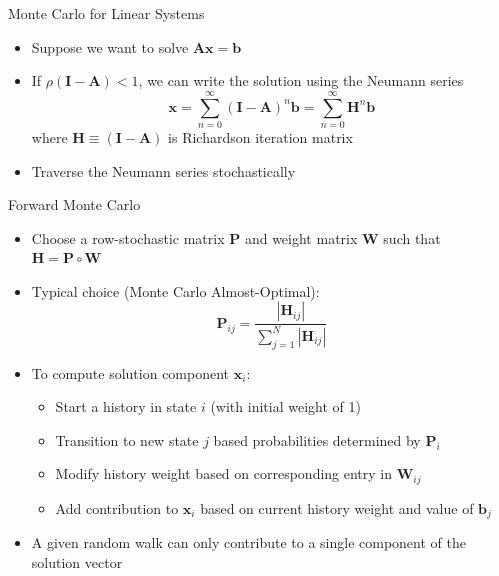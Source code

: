 \documentclass{beamer}
\begin{document}
\begin{frame}{Monte Carlo for Linear Systems}
  \begin{itemize}
    \item Suppose we want to solve $\mathbf{Ax}=\mathbf{b}$
    \vfill
    \item If $\rho(\mathbf{I-A})<1$, we can write the solution using the
      Neumann series
      \begin{equation*}
        \mathbf{x} = \sum_{n=0}^{\infty} (\mathbf{I-A})^n \mathbf{b}
         = \sum_{n=0}^{\infty} \mathbf{H}^n \mathbf{b}
      \end{equation*}
      where $\mathbf{H} \equiv ( \mathbf{I-A} )$ is Richardson iteration matrix
    \vfill
    \item Traverse the Neumann series stochastically
  \end{itemize}
\end{frame}
\begin{frame}{Forward Monte Carlo}
\begin{itemize}
  \item Choose a row-stochastic matrix $\mathbf{P}$ and weight matrix
    $\mathbf{W}$ such that $\mathbf{H} = \mathbf{P} \circ \mathbf{W}$
  \item Typical choice (Monte Carlo Almost-Optimal):
    \begin{equation*}
      \mathbf{P}_{ij} = \frac{| \mathbf{H}_{ij}| }
      {\sum_{j=1}^{N} | \mathbf{H}_{ij} | }
    \end{equation*}
  \item To compute solution component $\mathbf{x}_i$:
    \begin{itemize}
      \item Start a history in state $i$ (with initial weight of 1)
      \item Transition to new state $j$ based probabilities determined by
        $\mathbf{P}_i$
      \item Modify history weight based on corresponding entry in
        $\mathbf{W}_{ij}$
      \item Add contribution to $\mathbf{x}_i$ based on current history weight
        and value of $\mathbf{b}_j$
    \end{itemize}
  \item A given random walk can only contribute to a single component of
    the solution vector
\end{itemize}
\end{frame}
\end{document}
